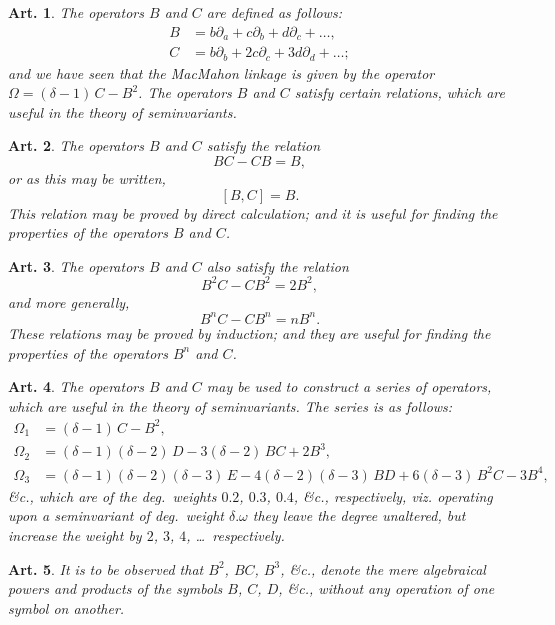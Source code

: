 \documentclass[11pt,a4paper]{article}
\theoremstyle{cayley}
\newtheorem{art}{Art.}[section]
\begin{document}
\setcounter{art}{74}
\begin{art}
The operators $B$ and $C$ are defined as follows:
\begin{align*}
B &= b\partial_{a} + c\partial_{b} + d\partial_{c} + \ldots,\\
C &= b\partial_{b} + 2c\partial_{c} + 3d\partial_{d} + \ldots;
\end{align*}
and we have seen that the MacMahon linkage is given by the operator $\Omega = (\delta - 1)\,C - B^{2}$. The operators $B$ and $C$ satisfy certain relations, which are useful in the theory of seminvariants.
\end{art}

\setcounter{art}{75}
\begin{art}
The operators $B$ and $C$ satisfy the relation
\[
BC - CB = B,
\]
or as this may be written,
\[
[B, C] = B.
\]
This relation may be proved by direct calculation; and it is useful for finding the properties of the operators $B$ and $C$.
\end{art}

\setcounter{art}{76}
\begin{art}
The operators $B$ and $C$ also satisfy the relation
\[
B^{2}C - CB^{2} = 2B^{2},
\]
and more generally,
\[
B^{n}C - CB^{n} = nB^{n}.
\]
These relations may be proved by induction; and they are useful for finding the properties of the operators $B^{n}$ and $C$.
\end{art}

\setcounter{art}{77}
\begin{art}
The operators $B$ and $C$ may be used to construct a series of operators, which are useful in the theory of seminvariants. The series is as follows:
\begin{align*}
\Omega_{1} &= (\delta - 1)\,C - B^{2},\\
\Omega_{2} &= (\delta - 1)(\delta - 2)\,D - 3(\delta - 2)\,BC + 2B^{3},\\
\Omega_{3} &= (\delta - 1)(\delta - 2)(\delta - 3)\,E - 4(\delta - 2)(\delta - 3)\,BD + 6(\delta - 3)\,B^{2}C - 3B^{4},
\end{align*}
\&c., which are of the deg.~weights $0.2$, $0.3$, $0.4$, \&c., respectively, viz. operating upon a seminvariant of deg.~weight $\delta.\omega$ they leave the degree unaltered, but increase the weight by $2$, $3$, $4$, \ldots\ respectively.
\end{art}

\setcounter{art}{78}
\begin{art}
It is to be observed that $B^{2}$, $BC$, $B^{3}$, \&c., denote the mere algebraical powers and products of the symbols $B$, $C$, $D$, \&c., without any operation of one symbol on another.
\end{art}
\end{document}
